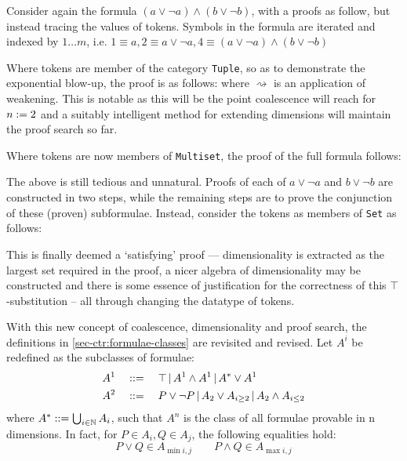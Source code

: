     \begin{examples}
        Consider again the formula $(a \vee \neg a) \wedge (b \vee \neg b)$, with a proofs as follow, but instead tracing the values of tokens.
        Symbols in the formula are iterated and indexed by $1 \ldots m$, i.e. $1 \equiv a, 2 \equiv  a \vee \neg a, 4 \equiv (a \vee \neg a) \wedge (b \vee \neg b)$

        Where tokens are member of the category \texttt{Tuple}, so as to demonstrate the exponential blow-up, the proof is as follows:
         where $\rightsquigarrow$ is an application of weakening.
        This is notable as this will be the point coalescence will reach for $n := 2$ and a suitably intelligent method for extending dimensions will maintain the proof search so far.


        Where tokens are now members of \texttt{Multiset}, the proof of the full formula follows:
        
        The above is still tedious and unnatural.
        Proofs of each of $a \vee \neg a$ and $b \vee \neg b$ are constructed in two steps, while the remaining steps are to prove the conjunction of these (proven) subformulae.
        Instead, consider the tokens as members of \texttt{Set} as follows:

        
        This is finally deemed a `satisfying' proof --- dimensionality is extracted as the largest set required in the proof, a nicer algebra of dimensionality may be constructed and there is some essence of justification for the correctness of this $\top$-substitution -- all through changing the datatype of tokens.
    \end{examples}

    \begin{definition*}
        With this new concept of coalescence, dimensionality and proof search, the definitions in \ref{sec-ctr:formulae-classes} are revisited and revised.
        Let $A^i$ be redefined as the subclasses of formulae:
        \begin{align*}
            A^1 \quad &::= \quad \top \,|\, A^1 \wedge A^1 \,|\, A^* \vee A^1 \\
            A^2 \quad &::= \quad P \vee \neg P \,|\, A_2 \vee A_{i \geq 2} \,|\, A_2 \wedge A_{i \leq 2}
        \end{align*}
        where $A^* ::= \bigcup_{i \in \mathbb{N}} A_i$, such that $A^n$ is the class of all formulae provable in n dimensions.
        In fact, for $P \in A_i, Q \in A_j$, the following equalities hold:
        \begin{equation*}
            P \vee Q \in A_{\min{i, j}}
            \qquad
            P \wedge Q \in A_{\max{i, j}}
        \end{equation*}

    \end{definition*}

